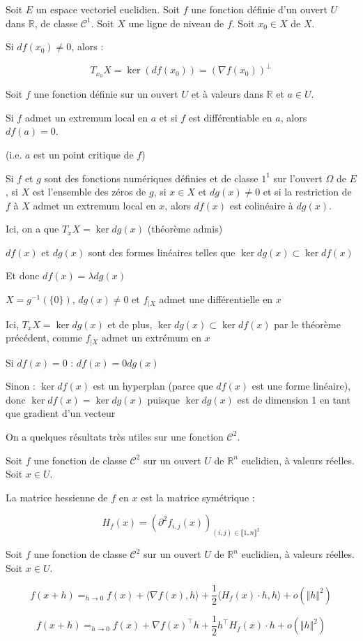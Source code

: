 \documentclass[a4paper,12pt]{book}
\newcommand{\Def}[2]{\begin{tcolorbox}[colback=white,colframe=red!10!green!20!blue!75!, title=Définition : #1]#2\end{tcolorbox}}
\newcommand{\Thr}[2]{\begin{tcolorbox}[sharp corners, colback=white,colframe=red!10!blue!30!green!75!, title=Théorème : #1]#2\end{tcolorbox}}
\newcommand{\Pre}[1]{\begin{tcolorbox}[sharp corners, colback=white,colframe=green!60!green!30!black!75, title=Preuve]#1\end{tcolorbox}}
\def\R{\mathbb{R}}
\begin{document}
\Thr{}{Soit $E$ un espace vectoriel euclidien. Soit $f$ une fonction définie d'un ouvert $U$ dans $\R$, de classe $\mathcal{C}^1$. Soit $X$ une ligne de niveau de $f$. Soit $x_0\in X$ de $X$.
\par Si $df(x_0)\neq 0$, alors :
\par $$T_{x_0}X =\ker(df(x_0))=(\nabla f(x_0))^\perp$$}
\Thr{}{Soit $f$ une fonction définie sur un ouvert $U$ et à valeurs dans $\R$ et $a\in U$.
\par Si $f$ admet un extremum local en $a$ et si $f$ est différentiable en $a$, alors $df(a)=0$.
\par (i.e. $a$ est un point critique de $f$)}
\Thr{optimisation sous une contrainte}{Si $f$ et $g$ sont des fonctions numériques définies et de classe $\mathcal{1}^1$ sur l'ouvert $\Omega$ de $E$, si $X$ est l'ensemble des zéros de $g$, si $x\in X$ et $dg(x)\neq 0$ et si la restriction de $f$ à $X$ admet un extremum local en $x$, alors $df(x)$ est colinéaire à $dg(x)$.}
\Pre{Ici, on a que $T_xX=\ker dg(x)$ (théorème admis)
\par $df(x)$ et $dg(x)$ sont des formes linéaires telles que $\ker dg(x)\subset \ker df(x)$
\par Et donc $df(x) = \lambda dg(x)$
\par $X = g^{-1}(\{0\})$, $dg(x)\neq 0$ et $f_{|X}$ admet une différentielle en $x$
\par Ici, $T_xX = \ker dg(x)$ et de plus, $\ker dg(x)\subset\ker df(x)$ par le théorème précédent, comme $f_{|X}$ admet un extrémum en $x$
\par Si $df(x)=0$ : $df(x) = 0dg(x)$
\par Sinon : $\ker df(x)$ est un hyperplan (parce que $df(x)$ est une forme linéaire), donc $\ker df(x) = \ker dg(x)$ puisque $\ker dg(x)$ est de dimension 1 en tant que gradient d'un vecteur}
On a quelques résultats très utiles sur une fonction $\mathcal{C}^2$.
\Def{}{Soit $f$ une fonction de classe $\mathcal{C}^2$ sur un ouvert $U$ de $\R^n$ euclidien, à valeurs réelles. Soit $x\in U$.
\par La matrice hessienne de $f$ en $x$ est la matrice symétrique :
\par $$H_f(x) = (\partial^2 f_{i,j}(x))_{(i,j)\in\llbracket1,n\rrbracket^2}$$}
\Thr{Formule de Taylor-Young à l'ordre 2}{Soit $f$ une fonction de classe $\mathcal{C}^2$ sur un ouvert $U$ de $\R^n$ euclidien, à valeurs réelles. Soit $x\in U$.
\par $$f(x+h)=_{h\to 0} f(x) + \langle \nabla f(x), h\rangle + \frac{1}{2}\langle H_f(x)\cdot h, h\rangle + o(\Vert h\Vert^2)$$
\par $$f(x+h)=_{h\to 0} f(x) + \nabla f(x)^\top h + \frac{1}{2}h^\top H_f(x)\cdot h + o(\Vert h\Vert^2)$$}
\end{document}
